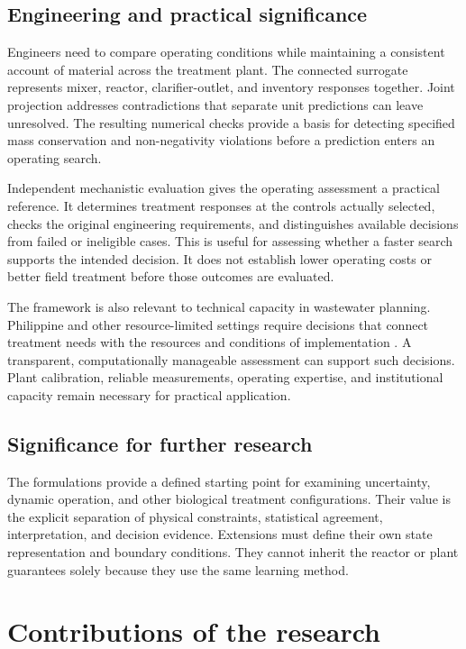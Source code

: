 \subsection{Engineering and practical significance}

Engineers need to compare operating conditions while maintaining a consistent account of material across the treatment plant. The connected surrogate represents mixer, reactor, clarifier-outlet, and inventory responses together. Joint projection addresses contradictions that separate unit predictions can leave unresolved. The resulting numerical checks provide a basis for detecting specified mass conservation and non-negativity violations before a prediction enters an operating search.

Independent mechanistic evaluation gives the operating assessment a practical reference. It determines treatment responses at the controls actually selected, checks the original engineering requirements, and distinguishes available decisions from failed or ineligible cases. This is useful for assessing whether a faster search supports the intended decision. It does not establish lower operating costs or better field treatment before those outcomes are evaluated.

The framework is also relevant to technical capacity in wastewater planning. Philippine and other resource-limited settings require decisions that connect treatment needs with the resources and conditions of implementation \citep{Tabios2020,DamalerioBarriers2022,Ulrich2009}. A transparent, computationally manageable assessment can support such decisions. Plant calibration, reliable measurements, operating expertise, and institutional capacity remain necessary for practical application.

\subsection{Significance for further research}

The formulations provide a defined starting point for examining uncertainty, dynamic operation, and other biological treatment configurations. Their value is the explicit separation of physical constraints, statistical agreement, interpretation, and decision evidence. Extensions must define their own state representation and boundary conditions. They cannot inherit the reactor or plant guarantees solely because they use the same learning method.

\section{Contributions of the research}

